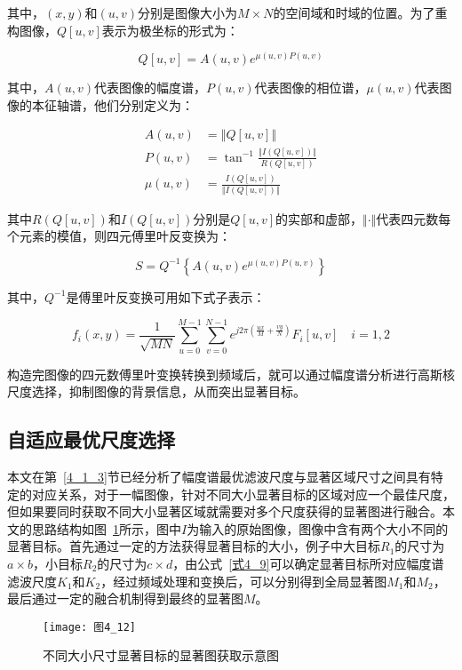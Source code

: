 其中，$(x,y)$和$(u,v)$分别是图像大小为$M×N$的空间域和时域的位置。为了重构图像，$Q[u,v]$表示为极坐标的形式为：
\begin{linenomath}
\begin{equation}
  \label{式4_19}
  Q[u,v]=A(u,v)e^{\mu(u,v) P(u,v)}
\end{equation}
\end{linenomath}
其中，$A(u,v)$代表图像的幅度谱，$P(u,v)$代表图像的相位谱，$\mu(u,v)$代表图像的本征轴谱，他们分别定义为：
\begin{linenomath}
\begin{align}
A(u,v) &= \left\Vert Q[u,v] \right\Vert \label{式4_20}\\
P(u,v) &= \tan^{-1}\frac{\left\Vert I\left(Q[u,v]\right)\right\Vert}{R\left(Q[u,v]\right)} \label{式4_21}\\
\mu(u,v) &= \frac{I\left(Q[u,v]\right)}{\left\Vert I\left(Q[u,v]\right)\right\Vert} \label{式4_22}
\end{align}
\end{linenomath}
其中$R\left(Q[u,v]\right)$和$I\left(Q[u,v]\right)$分别是$Q[u,v]$的实部和虚部，$\Vert\cdot\Vert$代表四元数每个元素的模值，则四元傅里叶反变换为：
\begin{linenomath}
\begin{equation}
  \label{式4_23}
  S=Q^{-1}\left\{A(u,v)e^{\mu(u,v)P(u,v)}\right\}
\end{equation}
\end{linenomath}
其中，$Q^{-1}$是傅里叶反变换可用如下式子表示：
\begin{linenomath}
\begin{equation}
f_i(x,y) = \frac{1}{\sqrt{MN}}\sum_{u=0}^{M-1}\sum_{v=0}^{N-1}e^{j 2\pi\left(\frac{ux}{M}+\frac{vy}{N}\right)}F_{i}[u,v]\quad i=1,2  
\label{式4_24}
\end{equation}
\end{linenomath}
构造完图像的四元数傅里叶变换转换到频域后，就可以通过幅度谱分析进行高斯核尺度选择，抑制图像的背景信息，从而突出显著目标。

\subsection{自适应最优尺度选择}
\label{4_2_2}

本文在第~\ref{4_1_3}节已经分析了幅度谱最优滤波尺度与显著区域尺寸之间具有特定的对应关系，对于一幅图像，针对不同大小显著目标的区域对应一个最佳尺度，但如果要同时获取不同大小显著区域就需要对多个尺度获得的显著图进行融合。本文的思路结构如图~\ref{图4_12}所示，图中$I$为输入的原始图像，图像中含有两个大小不同的显著目标。首先通过一定的方法获得显著目标的大小，例子中大目标$R_{1}$的尺寸为$a\times b$，小目标$R_{2}$的尺寸为$c\times d$，由公式~\ref{式4_9}可以确定显著目标所对应幅度谱滤波尺度$K_{1}$和$K_{2}$，经过频域处理和变换后，可以分别得到全局显著图$M_{1}$和$M_{2}$，最后通过一定的融合机制得到最终的显著图$M$。
\begin{figure}[h]
  \centering
  \texttt{[image: 图4\_12]}
  \caption{不同大小尺寸显著目标的显著图获取示意图}   
  \label{图4_12} 
\end{figure}


